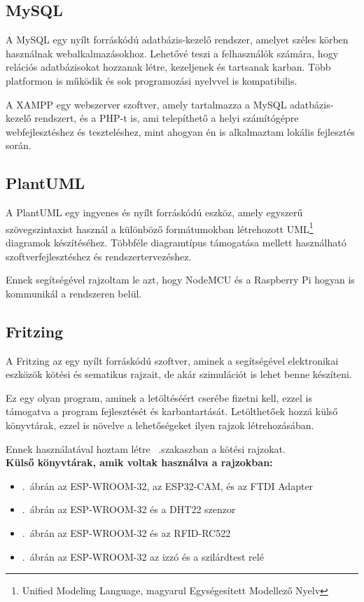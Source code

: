 \documentclass[
]{thesis-ekf}
\theoremstyle{definition}
\theoremstyle{remark}
\begin{document}
	\subsection{MySQL}
	A MySQL egy nyílt forráskódú adatbázis-kezelő rendszer, amelyet széles körben használnak webalkalmazásokhoz. Lehetővé teszi a felhasználók számára, hogy relációs adatbázisokat hozzanak létre, kezeljenek és tartsanak karban. Több platformon is működik és sok programozási nyelvvel is kompatibilis.
	
	A XAMPP egy webszerver szoftver, amely tartalmazza a MySQL adatbázis-kezelő rendszert, és a PHP-t is, ami telepíthető a helyi számítógépre webfejlesztéshez és teszteléshez, mint ahogyan én is alkalmaztam lokális fejlesztés során.
	\subsection{PlantUML}
	A PlantUML egy ingyenes és nyílt forráskódú eszköz, amely egyszerű szövegszintaxist használ a különböző formátumokban létrehozott UML\footnote{Unified Modeling Language, magyarul Egységesített Modellező Nyelv} diagramok készítéséhez. Többféle diagramtípus támogatása mellett használható szoftverfejlesztéshez és rendszertervezéshez.

	Ennek segítségével rajzoltam le azt, hogy NodeMCU és a Raspberry Pi hogyan is kommunikál a rendszeren belül.
	\subsection{Fritzing}
	A Fritzing az egy nyílt forráskódú szoftver, aminek a segítségével elektronikai eszközök kötési és sematikus rajzait, de akár szimulációt is lehet benne készíteni.
	
	Ez egy olyan program, aminek a letöltéséért cserébe fizetni kell, ezzel is támogatva a program fejlesztését és karbantartását. Letölthetőek hozzá külső könyvtárak, ezzel is növelve a lehetőségeket ilyen rajzok létrehozásában.
	
	Ennek használatával hoztam létre ~.szakaszban a kötési rajzokat.\\
	\textbf{Külső könyvtárak, amik voltak használva a rajzokban:}
	\begin{itemize}
		\item {}.~ábrán az ESP-WROOM-32, az ESP32-CAM, és az FTDI Adapter\cite{fritzing-library}
		\item {}.~ábrán az ESP-WROOM-32 és a DHT22 szenzor \cite{fritzing-library}
		\item {}.~ábrán az ESP-WROOM-32\cite{fritzing-library} és az RFID-RC522\cite{fritzing-rfid}
		\item {}.~ábrán az ESP-WROOM-32\cite{fritzing-library} az izzó\cite{fritzing-light} és a szilárdtest relé\cite{fritzing-SSR}
	\end{itemize}
\end{document}
